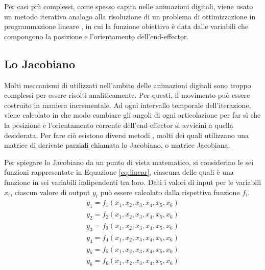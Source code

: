 Per casi più complessi, come spesso capita nelle animazioni digitali, viene usato un metodo iterativo  analogo alla risoluzione di un problema di ottimizzazione in programmazione lineare \cite{lp2017}, in cui la funzione obiettivo è data dalle variabili che compongono la posizione e l'orientamento dell'end-effector.

\subsection{Lo Jacobiano}

Molti meccanismi di utilizzati nell'ambito delle animazioni digitali sono troppo complessi per essere risolti analiticamente.
Per questi, il movimento può essere costruito in maniera incrementale.
Ad ogni intervallo temporale dell'iterazione, viene calcolato in che modo cambiare gli angoli di ogni articolazione per far sì che la posizione e l'orientamento corrente dell'end-effector si avvicini a quella desiderata.
Per fare ciò esistono diversi metodi \cite{simplex2011, simplex2006} \cite{mingozR2019} \cite{mingozD2019}, molti dei quali utilizzano una matrice di derivate parziali chiamata lo Jacobiano, o matrice Jacobiana.

Per spiegare lo Jacobiano da un punto di vista matematico, si considerino le sei funzioni rappresentate in Equazione \ref{eq:linear}, ciascuna delle quali è una funzione in sei variabili indipendenti tra loro.
Dati i valori di input per le variabili $x_i$, ciascun valore di output $y_i$ può essere calcolato dalla rispettiva funzione $f_i$.
\begin{equation} \label{eq:linear}
    \begin{aligned}
        y_1 = f_1(x_1,x_2,x_3,x_4,x_5,x_6)\\
        y_2 = f_2(x_1,x_2,x_3,x_4,x_5,x_6)\\
        y_3 = f_3(x_1,x_2,x_3,x_4,x_5,x_6)\\
        y_4 = f_4(x_1,x_2,x_3,x_4,x_5,x_6)\\
        y_5 = f_5(x_1,x_2,x_3,x_4,x_5,x_6)\\
        y_6 = f_6(x_1,x_2,x_3,x_4,x_5,x_6)
    \end{aligned}
\end{equation}

